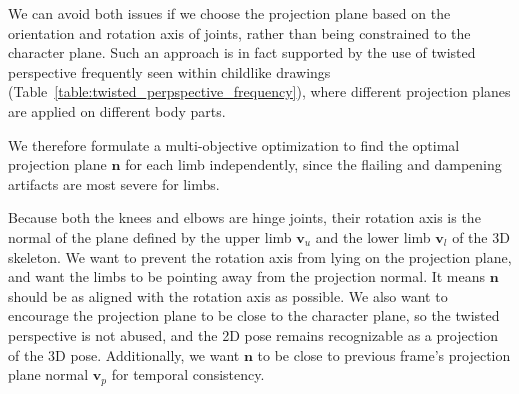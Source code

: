 \begin{comment}
While changes to \(\mathbf{V}\) will affect the magnitude of \(\mathbf{P_{xy}}\) its orientation \(\alpha\) will not change.
As a result, such rotations of \(\mathbf{V}\) result in no change in the character rig.
This appears frequently in practice, and results in the character's legs not bending as it walks directly towards the camera.
\end{comment}

We can avoid both issues if we choose the projection plane based on the orientation and rotation axis of joints, rather than being constrained to the character plane. Such an approach is in fact supported by the use of twisted perspective frequently seen within childlike drawings (Table~\ref{table:twisted_perpspective_frequency}), where different projection planes are applied on different body parts.

\begin{comment}
To solve both of these, we first observe that the root-view projection plane is only one of an infinite number of possible projection planes.
Secondly, we observe that the same plane does not need to be used for all frames of a motion; indeed, the same plane does not even need to be used consistently within the same frame.
Using different projection planes on different parts of the body results in twisted perspective, a feature frequently seen within childlike drawings (Figure~\ref{table:twisted_perpspective_frequency}).
\end{comment}

We therefore formulate a multi-objective optimization to find the optimal projection plane $\mathbf{n}$ for each limb independently, since the flailing and dampening artifacts are most severe for limbs. 

Because both the knees and elbows are hinge joints, their rotation axis is the normal of the plane defined by the upper limb $\mathbf{v}_u$ and the lower limb $\mathbf{v}_l$ of the 3D skeleton. We want to prevent the rotation axis from lying on the projection plane, and want the limbs to be pointing away from the projection normal. It means $\mathbf{n}$ should be as aligned with the rotation axis as possible. We also want to encourage the projection plane to be close to the character plane, so the twisted perspective is not abused, and the 2D pose remains recognizable as a projection of the 3D pose. Additionally, we want $\mathbf{n}$ to be close to previous frame's projection plane normal $\mathbf{v}_p$ for temporal consistency.

\begin{comment}
We compute this objective $E_p$ as 
$$E_p = -((\mathbf{v}_u \times \mathbf{v}_l)^T\mathbf{n})^2,$$
where $\mathbf{v}_u$ and $\mathbf{v}_l$ are assumed to be unit vectors. When they are collinear, the rotation axis is ill-defined, and this term naturally goes to zero.
\end{comment}

